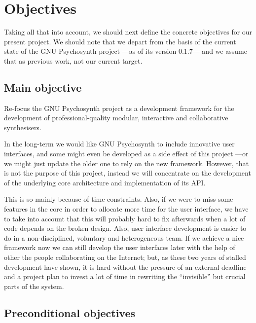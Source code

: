 \section{Objectives}

Taking all that into account, we should next define the concrete
objectives for our present project. We should note that we depart from
the basis of the current state of the GNU Psychosynth project ---as of
its version 0.1.7--- and we assume that as previous work, not our
current target.

\subsection{Main objective}
\label{sec:mainobjective}
\label{sec:userinterface}

\begin{objective}
  Re-focus the GNU Psychosynth project as a development framework for
  the development of professional-quality modular, interactive and
  collaborative synthesisers.
\end{objective}

In the long-term we would like GNU Psychosynth to include innovative
user interfaces, and some might even be developed as a side effect of
this project ---or we might just update the older one to rely on the
new framework. However, that is not the purpose of this project,
instead we will concentrate on the development of the underlying core
architecture and implementation of its API.

This is so mainly because of time constraints. Also, if we were to
miss some features in the core in order to allocate more time for the
user interface, we have to take into account that this will probably
hard to fix afterwards when a lot of code depends on the broken
design. Also, user interface development is easier to do in a
non-disciplined, voluntary and heterogeneous team. If we achieve a
nice framework now we can still develop the user interfaces later with
the help of other the people collaborating on the Internet; but, as
these two years of stalled development have shown, it is hard without
the pressure of an external deadline and a project plan to invest a
lot of time in rewriting the ``invisible'' but crucial parts of the
system.

\subsection{Preconditional objectives}

